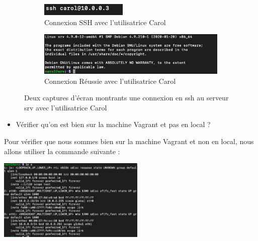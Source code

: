 \documentclass[12pt]{article}
\begin{document}
\begin{figure}[h]
  \centering
  \begin{subfigure}{0.30\textwidth}
    \centering
    \includegraphics[width=\textwidth]{Images-Client-SSH/Image-TD-SSH-1/SSH-Carol.png}
    \caption{Connexion SSH avec l'utilisatrice Carol}
  \end{subfigure}
  \vspace{0.9cm} %
  \begin{subfigure}{0.45\textwidth}
    \centering
    \includegraphics[width=\textwidth]{Images-Client-SSH/Image-TD-SSH-1/Connexion-SSH-Carol.png}
    \caption{Connexion Réussie avec l'utilisatrice Carol}
  \end{subfigure}
  \caption{Deux captures d'écran montrants une connexion en ssh au serveur srv avec l'utilisatrice Carol}
\end{figure}

\vspace{0.3cm}

\newpage

\vspace{0.3cm}

\begin{itemize}
  \item Vérifier qu'on est bien sur la machine Vagrant et pas en local ?
\end{itemize}

\vspace{0.3cm}

Pour vérifier que nous sommes bien sur la machine Vagrant et non en local, nous allons utiliser la commande suivante :

\vspace{0.3cm}

\begin{center}
  \includegraphics[width=7cm]{Images-Client-SSH/Image-TD-SSH-1/Commande-IPA.png}
\end{center}
\end{document}
